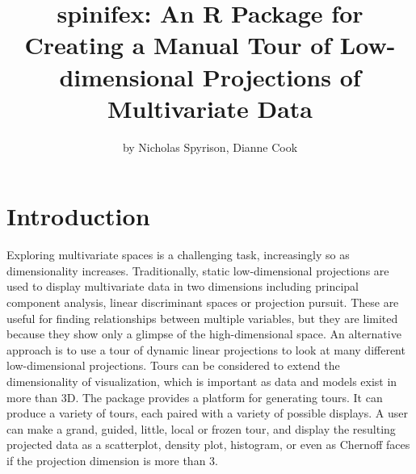 \title{spinifex: An R Package for Creating a Manual Tour of Low-dimensional
Projections of Multivariate Data}
\author{by Nicholas Spyrison, Dianne Cook}

\maketitle


\hypertarget{introduction}{%
\section{Introduction}\label{introduction}}

Exploring multivariate spaces is a challenging task, increasingly so as
dimensionality increases. Traditionally, static low-dimensional
projections are used to display multivariate data in two dimensions
including principal component analysis, linear discriminant spaces or
projection pursuit. These are useful for finding relationships between
multiple variables, but they are limited because they show only a
glimpse of the high-dimensional space. An alternative approach is to use
a tour \citep{asimov_grand_1985} of dynamic linear projections to look
at many different low-dimensional projections. Tours can be considered
to extend the dimensionality of visualization, which is important as
data and models exist in more than 3D. The package 
\citep{wickham_tourr:_2011} provides a platform for generating tours. It
can produce a variety of tours, each paired with a variety of possible
displays. A user can make a grand, guided, little, local or frozen tour,
and display the resulting projected data as a scatterplot, density plot,
histogram, or even as Chernoff faces if the projection dimension is more
than 3.

